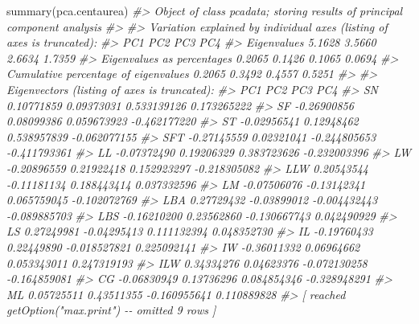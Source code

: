 \documentclass[
  11pt,
  a4paper]{article}
\newenvironment{Shaded}{\begin{snugshade}}{\end{snugshade}}
\newcommand{\CommentTok}[1]{\textcolor[rgb]{0.56,0.35,0.01}{\textit{#1}}}
\newcommand{\FunctionTok}[1]{\textcolor[rgb]{0.00,0.00,0.00}{#1}}
\newcommand{\NormalTok}[1]{#1}
\begin{document}
\begin{Shaded}
\begin{Highlighting}[]
\FunctionTok{summary}\NormalTok{(pca.centaurea)}
\CommentTok{\#\textgreater{} Object of class \textquotesingle{}pcadata\textquotesingle{}; storing results of principal component analysis}
\CommentTok{\#\textgreater{} }
\CommentTok{\#\textgreater{} Variation explained by individual axes (listing of axes is truncated):}
\CommentTok{\#\textgreater{}                                         PC1    PC2    PC3    PC4}
\CommentTok{\#\textgreater{} Eigenvalues                          5.1628 3.5660 2.6634 1.7359}
\CommentTok{\#\textgreater{} Eigenvalues as percentages           0.2065 0.1426 0.1065 0.0694}
\CommentTok{\#\textgreater{} Cumulative percentage of eigenvalues 0.2065 0.3492 0.4557 0.5251}
\CommentTok{\#\textgreater{} }
\CommentTok{\#\textgreater{} Eigenvectors (listing of axes is truncated):}
\CommentTok{\#\textgreater{}             PC1         PC2          PC3          PC4}
\CommentTok{\#\textgreater{} SN   0.10771859  0.09373031  0.533139126  0.173265222}
\CommentTok{\#\textgreater{} SF  {-}0.26900856  0.08099386  0.059673923 {-}0.462177220}
\CommentTok{\#\textgreater{} ST  {-}0.02956541  0.12948462  0.538957839 {-}0.062077155}
\CommentTok{\#\textgreater{} SFT {-}0.27145559  0.02321041 {-}0.244805653 {-}0.411793361}
\CommentTok{\#\textgreater{} LL  {-}0.07372490  0.19206329  0.383723626 {-}0.232003396}
\CommentTok{\#\textgreater{} LW  {-}0.20896559  0.21922418  0.152923297 {-}0.218305082}
\CommentTok{\#\textgreater{} LLW  0.20543544 {-}0.11181134  0.188443414  0.037332596}
\CommentTok{\#\textgreater{} LM  {-}0.07506076 {-}0.13142341  0.065759045 {-}0.102072769}
\CommentTok{\#\textgreater{} LBA  0.27729432 {-}0.03899012 {-}0.004432443 {-}0.089885703}
\CommentTok{\#\textgreater{} LBS {-}0.16210200  0.23562860 {-}0.130667743  0.042490929}
\CommentTok{\#\textgreater{} LS   0.27249981 {-}0.04295413  0.111132394  0.048352730}
\CommentTok{\#\textgreater{} IL  {-}0.19760433  0.22449890 {-}0.018527821  0.225092141}
\CommentTok{\#\textgreater{} IW  {-}0.36011332  0.06964662  0.053343011  0.247319193}
\CommentTok{\#\textgreater{} ILW  0.34334276  0.04623376 {-}0.072130258 {-}0.164859081}
\CommentTok{\#\textgreater{} CG  {-}0.06830949  0.13736296  0.084854346 {-}0.328948291}
\CommentTok{\#\textgreater{} ML   0.05725511  0.43511355 {-}0.160955641  0.110889828}
\CommentTok{\#\textgreater{}  [ reached getOption("max.print") {-}{-} omitted 9 rows ]}
\end{Highlighting}
\end{Shaded}
\end{document}
